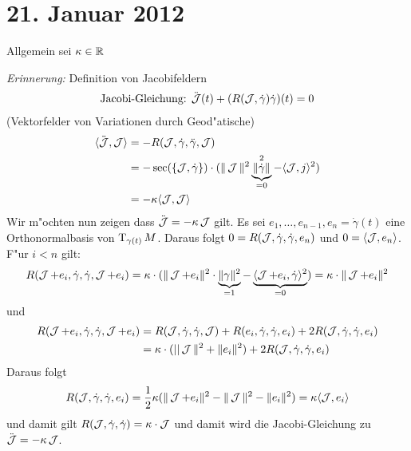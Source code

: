 \section{21. Januar 2012}
\setcounter{Aufg}{0} %
\setcounter{Loes}{0}

Allgemein sei $\kappa \in \operatorname{\mathbb{R}}$
\begin{Loes}
\emph{Erinnerung:} Definition von Jacobifeldern
\begin{align*}
	\text{Jacobi-Gleichung: } \ddot{\operatorname{\mathcal{J}}}(t) + (R(\operatorname{\mathcal{J}}, \dot\gamma) \dot\gamma) (t) = 0
\end{align*}
(Vektorfelder von Variationen durch Geod"atische)
\begin{align*}
	\langle \ddot\calJ, \calJ \rangle & = -R(\calJ, \dot\gamma, \ddot\gamma, \calJ) \\
	& = -\sec(\span\{\calJ, \dot\gamma\}) \cdot (\|\calJ\|^2 \underbrace{\|\dot\gamma\|}_{=0}^2 - \langle\calJ, j \rangle^2) \\
	& = - \kappa \langle \calJ, \calJ \rangle
\end{align*}
Wir m"ochten nun zeigen dass $\ddot{\operatorname{\mathcal{J}}} = -\kappa \operatorname{\mathcal{J}}$ gilt. Es sei $e_1, \ldots ,e_{n-1}, e_n = \dot\gamma(t)$ eine Orthonormalbasis von $\operatorname{T}_{\gamma(t)}M$.
Daraus folgt $0 = R(\operatorname{\mathcal{J}}, \dot\gamma, \dot\gamma, e_n)$ und $0 = \langle \operatorname{\mathcal{J}}, e_n \rangle$. F"ur $i < n$ gilt:
\begin{align*}
	R(\operatorname{\mathcal{J}} + e_i, \dot\gamma, \dot\gamma, \operatorname{\mathcal{J}} + e_i) = \kappa \cdot ( \| \operatorname{\mathcal{J}} + e_i \|^2 \cdot \underbrace{\| \gamma \|^2}_{=1} - \underbrace{\langle \operatorname{\mathcal{J}} + e_i, \dot\gamma \rangle^2}_{=0}) = \kappa \cdot \| \operatorname{\mathcal{J}} + e_i \|^2
\end{align*}
und
\begin{align*}
	R(\operatorname{\mathcal{J}} + e_i, \dot\gamma, \dot\gamma, \operatorname{\mathcal{J}} + e_i) &= R(\operatorname{\mathcal{J}}, \dot\gamma, \dot\gamma, \operatorname{\mathcal{J}}) + R(e_i, \dot\gamma, \dot\gamma, e_i) + 2R(\operatorname{\mathcal{J}}, \dot\gamma, \dot\gamma, e_i) \\
	&= \kappa \cdot ( ||\operatorname{\mathcal{J}}\|^2 + \|e_i\|^2) + 2R(\operatorname{\mathcal{J}}, \dot\gamma, \dot\gamma, e_i)
\end{align*}
Daraus folgt
\begin{align*}
	R(\operatorname{\mathcal{J}}, \dot\gamma, \dot\gamma, e_i) = \frac{1}{2}\kappa ( \|\operatorname{\mathcal{J}} + e_i\|^2 - \|\operatorname{\mathcal{J}}\|^2 - \|e_i\|^2 ) = \kappa \langle \operatorname{\mathcal{J}}, e_i \rangle
\end{align*}
und damit gilt $R(\operatorname{\mathcal{J}}, \dot\gamma, \dot\gamma) = \kappa \cdot \operatorname{\mathcal{J}}$ und damit wird die Jacobi-Gleichung zu $\ddot{\operatorname{\mathcal{J}}} = -\kappa \operatorname{\mathcal{J}}$.

\end{Loes}
